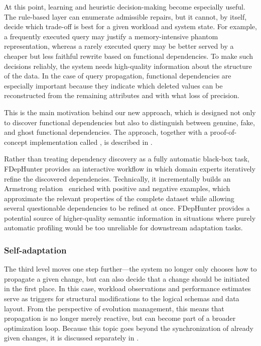 At this point, learning and heuristic decision-making become especially useful. The rule-based layer can enumerate admissible repairs, but it cannot, by itself, decide which trade-off is best for a given workload and system state. For example, a frequently executed query may justify a memory-intensive phantom representation, whereas a rarely executed query may be better served by a cheaper but less faithful rewrite based on functional dependencies. To make such decisions reliably, the system needs high-quality information about the structure of the data. In the case of query propagation, functional dependencies are especially important because they indicate which deleted values can be reconstructed from the remaining attributes and with what loss of precision.

This is the main motivation behind our new approach, which is designed not only to discover functional dependencies but also to distinguish between genuine, fake, and ghost functional dependencies. The approach, together with a proof-of-concept implementation called , is described in .

Rather than treating dependency discovery as a fully automatic black-box task, FDepHunter provides an interactive workflow in which domain experts iteratively refine the discovered dependencies. Technically, it incrementally builds an Armstrong relation~\citep{DBLP:books/aw/AbiteboulHV95} enriched with positive and negative examples, which approximate the relevant properties of the complete dataset while allowing several questionable dependencies to be refined at once. FDepHunter provides a potential source of higher-quality semantic information in situations where purely automatic profiling would be too unreliable for downstream adaptation tasks.

\subsubsection{Self-adaptation}

The third level moves one step further---the system no longer only chooses how to propagate a given change, but can also decide that a change should be initiated in the first place. In this case, workload observations and performance estimates serve as triggers for structural modifications to the logical schemas and data layout. From the perspective of evolution management, this means that propagation is no longer merely reactive, but can become part of a broader optimization loop. Because this topic goes beyond the synchronization of already given changes, it is discussed separately in .


